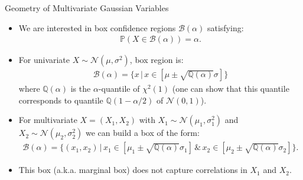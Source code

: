 \documentclass[9pt]{beamer}
\begin{document}
%
\begin{frame}{Geometry of Multivariate Gaussian Variables}

\begin{itemize}
\item We are interested in box confidence regions $\mathcal{B}(\alpha)$ satisfying:
\begin{align*}
\mathbb{P}(X\in \mathcal{B}(\alpha))=\alpha.
\end{align*}
\item For univariate $X\sim \mathcal{N}(\mu,\sigma^2)$, box region is:
\begin{align*}
\mathcal{B}(\alpha)=\{x\,|\,x\in [\mu\pm \sqrt{\mathbb{Q}(\alpha)} \sigma]\} 
\end{align*}
where $\mathbb{Q}(\alpha)$ is the $\alpha$-quantile of $\chi^2(1)$ (one can show that this quantile corresponds to quantile $\mathbb{Q}(1-\alpha/2)$ of $\mathcal{N}(0,1)$). 
\item For multivariate $X=(X_1,X_2)$ with $X_1\sim \mathcal{N}(\mu_1,\sigma_1^2)$ and $X_2\sim \mathcal{N}(\mu_2,\sigma_2^2)$ we can build a box of the form:
\begin{align*}
\mathcal{B}(\alpha)=\{(x_1,x_2)\,|\,x_1\in [\mu_1\pm \sqrt{\mathbb{Q}(\alpha)}\sigma_1]\,\&\,x_2\in [\mu_2\pm \sqrt{\mathbb{Q}(\alpha)}\sigma_2]\}.
\end{align*}
\item This box (a.k.a. marginal box) does not capture correlations in $X_1$ and $X_2$. 
\end{itemize}

\end{frame}
\end{document}
